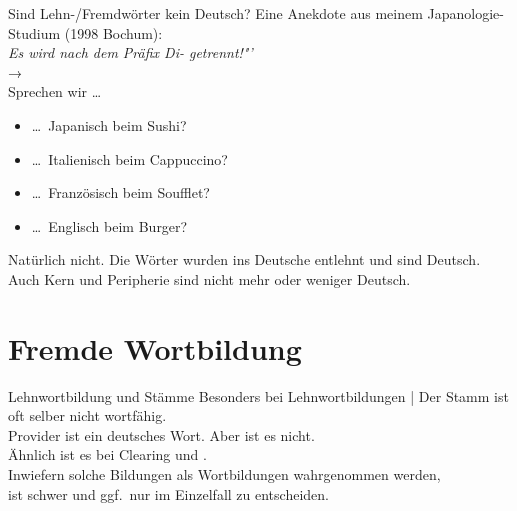 \begin{frame}
  {Sind Lehn-\slash Fremdwörter kein Deutsch?}
  \onslide<+->
  \onslide<+->
  Eine Anekdote aus meinem Japanologie-Studium (1998 Bochum):\\
  \Viertelzeile
  \textit{ Es wird nach dem Präfix Di- getrennt!"'}\\
  \onslide<+->
  \Viertelzeile
  →  \\
  \onslide<+->
  \Zeile
  Sprechen wir \ldots
  \begin{itemize}[<+->]
    \item \ldots\ Japanisch beim \alert{Sushi}?
    \item \ldots\ Italienisch beim \alert{Cappuccino}?
    \item \ldots\ Französisch beim \alert{Soufflet}?
    \item \ldots\ Englisch beim \alert{Burger}?
  \end{itemize}
  \Halbzeile
  \onslide<+->
  Natürlich nicht. Die Wörter wurden \alert{ins Deutsche entlehnt und sind Deutsch}.\\
  \Viertelzeile
  Auch \alert{Kern und Peripherie} sind nicht mehr oder weniger Deutsch.
\end{frame}

\section{Fremde Wortbildung}

\begin{frame}
  {Lehnwortbildung und Stämme}
  \onslide<+->
  \onslide<+->
  Besonders bei Lehnwortbildungen | Der \alert{Stamm} ist oft selber \alert{nicht wortfähig}.\\
  \Zeile
  \onslide<+->
  \alert{Provider} ist ein deutsches Wort. \onslide<+-> Aber  ist es nicht.\\
  \Viertelzeile
  \onslide<+->
  Ähnlich ist es bei \alert{Clearing} und .\\
  \onslide<+->
  \Zeile
  Inwiefern solche Bildungen als Wortbildungen wahrgenommen werden,\\
  ist schwer und ggf.\ nur im Einzelfall zu entscheiden.
\end{frame}

